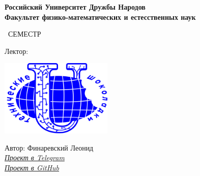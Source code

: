 \begin{titlepage}
	\clearpage\thispagestyle{empty}
	\centering
	
	\textbf{Российский Университет Дружбы Народов \\ Факультет физико-математических и естесственных наук}
	\vspace{33ex}
	
	{\Huge\textbf{\FullCourseNameFirstPart}}
	
	\SemesterNumber\ СЕМЕСТР  
	\vspace{1ex}
	
	Лектор: \textit{\LecturerInitials}

	\vspace{15mm}
	
	\includegraphics[width=0.4\textwidth]{images/logo.png}

	\begin{flushright}
		\noindent
		Автор: Финаревский Леонид
		\\
		\href{\TGLink}{\textit{Проект в Telegram}}
		\\
		\href{\GitLink}{\textit{Проект в GitHub}}
	\end{flushright}
	
	\vfill
	\CourseDate
	\pagebreak
\end{titlepage}